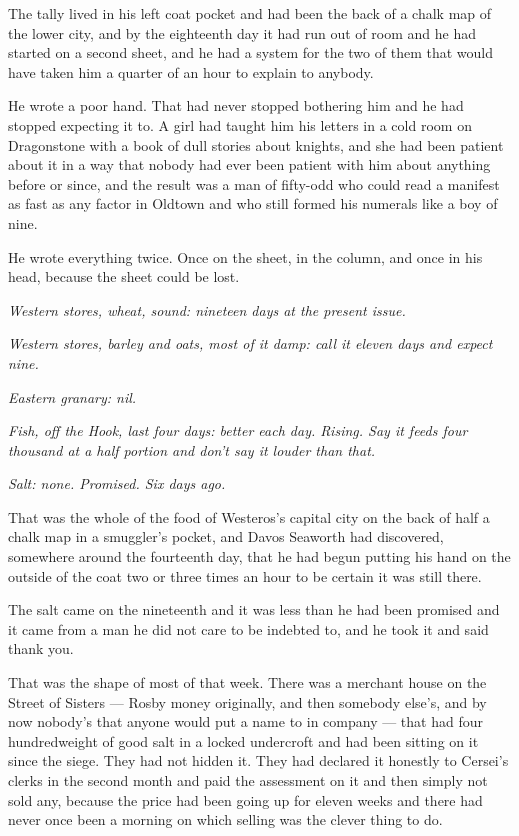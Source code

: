 The tally lived in his left coat pocket and had been the back of a chalk map of the lower city, and by the eighteenth day it had run out of room and he had started on a second sheet, and he had a system for the two of them that would have taken him a quarter of an hour to explain to anybody.

He wrote a poor hand. That had never stopped bothering him and he had stopped expecting it to. A girl had taught him his letters in a cold room on Dragonstone with a book of dull stories about knights, and she had been patient about it in a way that nobody had ever been patient with him about anything before or since, and the result was a man of fifty-odd who could read a manifest as fast as any factor in Oldtown and who still formed his numerals like a boy of nine.

He wrote everything twice. Once on the sheet, in the column, and once in his head, because the sheet could be lost.

\textit{Western stores, wheat, sound: nineteen days at the present issue.}

\textit{Western stores, barley and oats, most of it damp: call it eleven days and expect nine.}

\textit{Eastern granary: nil.}

\textit{Fish, off the Hook, last four days: better each day. Rising. Say it feeds four thousand at a half portion and don’t say it louder than that.}

\textit{Salt: none. Promised. Six days ago.}

That was the whole of the food of Westeros’s capital city on the back of half a chalk map in a smuggler’s pocket, and Davos Seaworth had discovered, somewhere around the fourteenth day, that he had begun putting his hand on the outside of the coat two or three times an hour to be certain it was still there.

\sceneBreak

The salt came on the nineteenth and it was less than he had been promised and it came from a man he did not care to be indebted to, and he took it and said thank you.

That was the shape of most of that week. There was a merchant house on the Street of Sisters — Rosby money originally, and then somebody else’s, and by now nobody’s that anyone would put a name to in company — that had four hundredweight of good salt in a locked undercroft and had been sitting on it since the siege. They had not hidden it. They had declared it honestly to Cersei’s clerks in the second month and paid the assessment on it and then simply not sold any, because the price had been going up for eleven weeks and there had never once been a morning on which selling was the clever thing to do.

